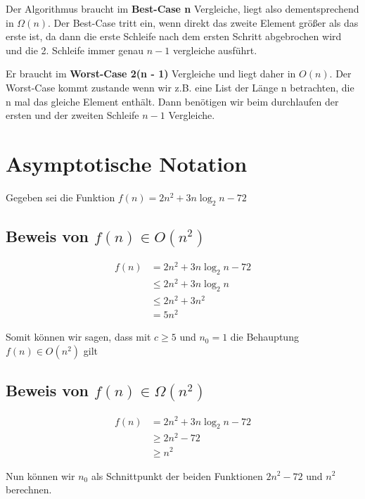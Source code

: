 \documentclass{article}
\begin{document}
Der Algorithmus braucht im \textbf{Best-Case n} Vergleiche, liegt also dementsprechend in $\Omega(n)$. Der Best-Case tritt ein,
wenn direkt das zweite Element größer als das erste ist, da dann die erste Schleife nach dem ersten Schritt abgebrochen wird und
die 2. Schleife immer genau $n - 1$ vergleiche ausführt.

Er braucht im \textbf{Worst-Case 2(n - 1)} Vergleiche und liegt daher in $O(n)$. Der Worst-Case kommt zustande wenn wir z.B. eine
List der Länge n betrachten, die n mal das gleiche Element enthält. Dann benötigen wir beim durchlaufen der ersten und der zweiten
Schleife $n - 1$ Vergleiche.

\section{Asymptotische Notation}

Gegeben sei die Funktion $f(n) = 2n^2 + 3n\log_2n - 72$

\subsection{Beweis von $f(n) \in O(n^2)$}

\begin{align*}
	f(n) & = 2n^2 + 3n\log_2n - 72 \\
	     & \leq 2n^2 + 3n\log_2n   \\
	     & \leq 2n^2 + 3n^2        \\
	     & = 5n^2
\end{align*}

\begin{flushleft}
	Somit können wir sagen, dass mit $c \geq 5$ und $n_0 = 1$ die Behauptung $f(n) \in O(n^2)$ gilt
\end{flushleft}

\subsection{Beweis von $f(n) \in \Omega(n^2)$}

\begin{align*}
	f(n) & = 2n^2 + 3n\log_2n - 72 \\
	     & \geq 2n^2 - 72          \\
	     & \geq n^2
\end{align*}

\begin{flushleft}
	Nun können wir $n_0$ als Schnittpunkt der beiden Funktionen $2n^2 - 72$ und $n^2$ berechnen.
\end{flushleft}
\end{document}
